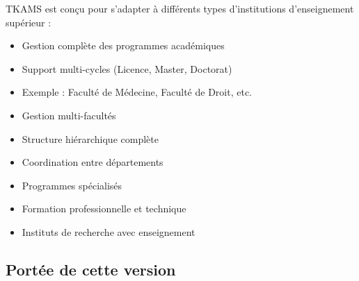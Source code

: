 TKAMS est conçu pour s'adapter à différents types d'institutions d'enseignement supérieur :

\begin{description}[leftmargin=3cm, style=nextline]
    \item[Facultés]
    \begin{itemize}
        \item Gestion complète des programmes académiques
        \item Support multi-cycles (Licence, Master, Doctorat)
        \item Exemple : Faculté de Médecine, Faculté de Droit, etc.
    \end{itemize}

    \item[Universités]
    \begin{itemize}
        \item Gestion multi-facultés
        \item Structure hiérarchique complète
        \item Coordination entre départements
    \end{itemize}

    \item[Instituts]
    \begin{itemize}
        \item Programmes spécialisés
        \item Formation professionnelle et technique
        \item Instituts de recherche avec enseignement
    \end{itemize}
\end{description}

\subsection{Portée de cette version}

